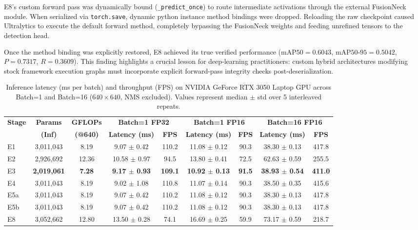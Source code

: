 \documentclass[conference]{IEEEtran}
\begin{document}
E8's custom forward pass was dynamically bound (\texttt{\_predict\_once}) to route intermediate activations through the external FusionNeck module. When serialized via \texttt{torch.save}, dynamic python instance method bindings were dropped. Reloading the raw checkpoint caused Ultralytics to execute the default forward method, completely bypassing the FusionNeck weights and feeding unrefined tensors to the detection head. 

Once the method binding was explicitly restored, E8 achieved its true verified performance ($\text{mAP50} = 0.6043$, $\text{mAP50-95} = 0.5042$, $P = 0.7317$, $R = 0.3609$). This finding highlights a crucial lesson for deep-learning practitioners: custom hybrid architectures modifying stock framework execution graphs must incorporate explicit forward-pass integrity checks post-deserialization.

\begin{table}[t]
\centering
\caption{Inference latency (ms per batch) and throughput (FPS) on NVIDIA GeForce RTX 3050 Laptop GPU across Batch=1 and Batch=16 ($640\times640$, NMS excluded). Values represent median $\pm$ std over 5 interleaved repeats.}
\label{tab:compute_table}
\small
\begin{tabular}{l c c c c c c c c}
\toprule
\textbf{Stage} & \textbf{Params} & \textbf{GFLOPs} & \multicolumn{2}{c}{\textbf{Batch=1 FP32}} & \multicolumn{2}{c}{\textbf{Batch=1 FP16}} & \multicolumn{2}{c}{\textbf{Batch=16 FP16}} \\
 & \textbf{(Inf)} & \textbf{(@640)} & \textbf{Latency (ms)} & \textbf{FPS} & \textbf{Latency (ms)} & \textbf{FPS} & \textbf{Latency (ms)} & \textbf{FPS} \\
\midrule
E1 & 3,011,043 & 8.19 & 9.07 $\pm$ 0.42 & 110.2 & 11.08 $\pm$ 0.12 & 90.3 & 38.30 $\pm$ 0.13 & 417.8 \\
E2 & 2,926,692 & 12.36 & 10.58 $\pm$ 0.97 & 94.5 & 13.80 $\pm$ 0.41 & 72.5 & 62.63 $\pm$ 0.59 & 255.5 \\
E3 & \textbf{2,019,061} & \textbf{7.28} & \textbf{9.17 $\pm$ 0.93} & \textbf{109.1} & \textbf{10.92 $\pm$ 0.13} & \textbf{91.5} & \textbf{38.93 $\pm$ 0.54} & \textbf{411.0} \\
E4 & 3,011,043 & 8.19 & 9.02 $\pm$ 1.08 & 110.8 & 11.07 $\pm$ 0.14 & 90.3 & 38.50 $\pm$ 0.35 & 415.6 \\
E5a & 3,011,043 & 8.19 & 9.07 $\pm$ 0.42 & 110.2 & 11.08 $\pm$ 0.12 & 90.3 & 38.30 $\pm$ 0.13 & 417.8 \\
E5b & 3,011,043 & 8.19 & 9.07 $\pm$ 0.42 & 110.2 & 11.08 $\pm$ 0.12 & 90.3 & 38.30 $\pm$ 0.13 & 417.8 \\
E8 & 3,052,662 & 12.80 & 13.50 $\pm$ 0.28 & 74.1 & 16.69 $\pm$ 0.25 & 59.9 & 73.17 $\pm$ 0.59 & 218.7 \\
\bottomrule
\end{tabular}
\end{table}
\end{document}
